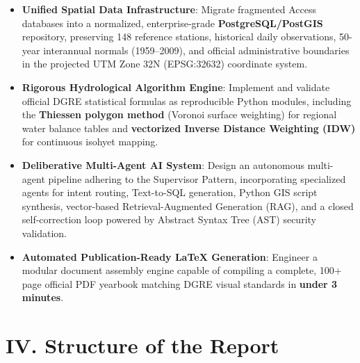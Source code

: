 \documentclass[12pt,a4paper]{report}
\begin{document}
\begin{itemize}
  \item \textbf{Unified Spatial Data Infrastructure}: Migrate fragmented Access databases into a normalized, enterprise-grade \textbf{PostgreSQL/PostGIS} repository, preserving 148 reference stations, historical daily observations, 50-year interannual normals (1959--2009), and official administrative boundaries in the projected UTM Zone 32N (EPSG:32632) coordinate system.
  \item \textbf{Rigorous Hydrological Algorithm Engine}: Implement and validate official DGRE statistical formulas as reproducible Python modules, including the \textbf{Thiessen polygon method} (Voronoi surface weighting) for regional water balance tables and \textbf{vectorized Inverse Distance Weighting (IDW)} for continuous isohyet mapping.
  \item \textbf{Deliberative Multi-Agent AI System}: Design an autonomous multi-agent pipeline adhering to the Supervisor Pattern, incorporating specialized agents for intent routing, Text-to-SQL generation, Python GIS script synthesis, vector-based Retrieval-Augmented Generation (RAG), and a closed self-correction loop powered by Abstract Syntax Tree (AST) security validation.
  \item \textbf{Automated Publication-Ready LaTeX Generation}: Engineer a modular document assembly engine capable of compiling a complete, 100+ page official PDF yearbook matching DGRE visual standards in \textbf{under 3 minutes}.
\end{itemize}

\section*{IV. Structure of the Report}
\end{document}
